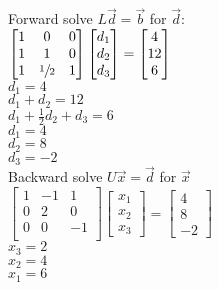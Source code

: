 \documentclass[12pt]{article}
\begin{document}
Forward solve $L\vec{d} = \vec{b}$ for $\vec{d}$:\\
$
    \begin{bmatrix}
        1 & 0            & 0 \\
        1 & 1            & 0 \\
        1 & \sfrac{1}{2} & 1 \\
    \end{bmatrix}
    \begin{bmatrix}
        d_1 \\d_2\\d_3
    \end{bmatrix}
    =
    \begin{bmatrix}
        4 \\12\\6
    \end{bmatrix}
$\\
$d_1 = 4$\\
$d_1 + d_2 = 12$\\
$d_1 + \frac{1}{2}d_2 + d_3 = 6$\\

$d_1 = 4$\\
$d_2 = 8$\\
$d_3 = -2$\\

Backward solve $U\vec{x} = \vec{d}$ for $\vec{x}$\\
$
    \begin{bmatrix}
        1 & -1 & 1  \\
        0 & 2  & 0  \\
        0 & 0  & -1 \\
    \end{bmatrix}
    \begin{bmatrix}
        x_1 \\x_2\\x_3
    \end{bmatrix}
    =
    \begin{bmatrix}
        4 \\8\\-2
    \end{bmatrix}
$\\

$x_3 = 2$\\
$x_2 = 4$\\
$x_1 = 6$\\
\end{document}
